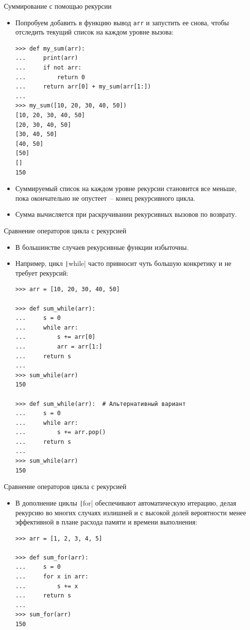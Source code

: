 \documentclass[aspectratio=169]{beamer}%
\begin{document}
\begin{frame}[fragile]{Суммирование с помощью рекурсии}
\scriptsize
\begin{itemize}
\item Попробуем добавить в функцию вывод \texttt{arr} и запустить ее снова, чтобы отследить текущий список на каждом уровне вызова:

\begin{verbatim}
>>> def my_sum(arr):
...     print(arr)
...     if not arr:
...         return 0
...     return arr[0] + my_sum(arr[1:])
...
>>> my_sum([10, 20, 30, 40, 50])
[10, 20, 30, 40, 50]
[20, 30, 40, 50]
[30, 40, 50]
[40, 50]
[50]
[]
150
\end{verbatim}

\item Суммируемый список на каждом уровне рекурсии становится все меньше, пока окончательно не опустеет~-- конец рекурсивного цикла. 
\item Сумма вычисляется при раскручивании рекурсивных вызовов по возврату.
\end{itemize}
\vfill
\end{frame}


\begin{frame}[fragile]{Сравнение операторов цикла с рекурсией}
\scriptsize
\begin{itemize}
\item В большинстве случаев рекурсивные функции избыточны.
\item Например, цикл \texttt|while| часто привносит чуть большую конкретику и не требует рекурсий:

\begin{verbatim}
>>> arr = [10, 20, 30, 40, 50]

>>> def sum_while(arr):
...     s = 0
...     while arr:
...         s += arr[0]
...         arr = arr[1:]
...     return s
...
>>> sum_while(arr)
150

>>> def sum_while(arr):  # Альтернативный вариант
...     s = 0
...     while arr:
...         s += arr.pop()
...     return s
...
>>> sum_while(arr)
150
\end{verbatim}
\end{itemize}
\vfill
\end{frame}


\begin{frame}[fragile]{Сравнение операторов цикла с рекурсией}
\scriptsize
\begin{itemize}
\item В дополнение циклы \texttt|for| обеспечивают автоматическую итерацию, делая рекурсию во многих случаях излишней и с высокой долей вероятности менее эффективной в плане расхода памяти и времени выполнения:

\begin{verbatim}
>>> arr = [1, 2, 3, 4, 5]

>>> def sum_for(arr):
...     s = 0
...     for x in arr:
...         s += x
...     return s
...
>>> sum_for(arr)
150
\end{verbatim}
\end{itemize}
\vfill
\end{frame}
\end{document}
